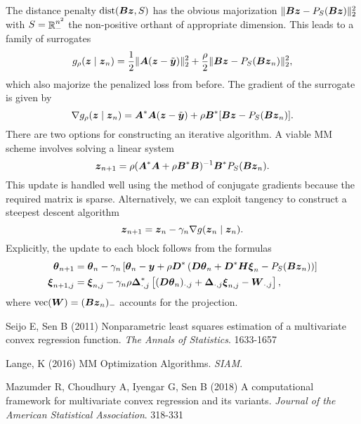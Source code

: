 \documentclass{article}
\begin{document}
The distance penalty \(\mathop{\rm dist}\nolimits(\boldsymbol{B} \boldsymbol{z}, S)\) has the obvious majorization \(\|\boldsymbol{B} \boldsymbol{z} - P_{S}(\boldsymbol{B} \boldsymbol{z})\|^{2}_{2}\) with \(S = \mathop{\mathbb{R}}\nolimits^{n^{2}}_{-}\) the non-positive orthant of appropriate dimension.
This leads to a family of surrogates
\begin{equation*}
    g_{\rho}(\boldsymbol{z} \mid \boldsymbol{z}_{n})
    =
    \frac{1}{2} \|\boldsymbol{A} (\boldsymbol{z} - \tilde{\boldsymbol{y}})\|_{2}^{2}
    +
    \frac{\rho}{2} \|\boldsymbol{B} \boldsymbol{z} - P_{S}(\boldsymbol{B} \boldsymbol{z}_{n})\|^{2}_{2},
\end{equation*}
which also majorize the penalized loss from before.
The gradient of the surrogate is given by
\begin{equation*}
    \nabla g_{\rho}(\boldsymbol{z} \mid \boldsymbol{z}_{n})
    =
    \boldsymbol{A}^{\ast} \boldsymbol{A} (\boldsymbol{z} - \tilde{\boldsymbol{y}})
    +
    \rho \boldsymbol{B}^{\ast}[\boldsymbol{B} \boldsymbol{z} - P_{S}(\boldsymbol{B} \boldsymbol{z}_{n})].
\end{equation*}
There are two options for constructing an iterative algorithm.
A viable MM scheme involves solving a linear system
\begin{equation*}
    \boldsymbol{z}_{n+1}
    =
    \rho (\boldsymbol{A}^{\ast} \boldsymbol{A} + \rho \boldsymbol{B}^{\ast} \boldsymbol{B})^{-1}
    \boldsymbol{B}^{\ast} P_{S}(\boldsymbol{B} \boldsymbol{z}_{n}).
\end{equation*}
This update is handled well using the method of conjugate gradients because the required matrix is sparse.
Alternatively, we can exploit tangency to construct a steepest descent algorithm
\begin{equation*}
    \boldsymbol{z}_{n+1}
    =
    \boldsymbol{z}_{n} - \gamma_{n} \nabla g(\boldsymbol{z}_{n} \mid \boldsymbol{z}_{n}).
\end{equation*}
Explicitly, the update to each block follows from the formulas
\begin{align*}
    \boldsymbol{\theta}_{n+1}
    &=
    \boldsymbol{\theta}_{n} - \gamma_{n}\left[
        \boldsymbol{\theta}_{n} - \boldsymbol{y}
        + \rho \boldsymbol{D}^{\ast} \left(\boldsymbol{D} \boldsymbol{\theta}_{n}
        + \boldsymbol{D}^{\ast} \boldsymbol{H} \boldsymbol{\xi}_{n} - P_{S}(\boldsymbol{B} \boldsymbol{z}_{n})
        \right)
    \right] \\
    \boldsymbol{\xi}_{n+1,j}
    &=
    \boldsymbol{\xi}_{n,j} - \gamma_{n} \rho \boldsymbol{\Delta}_{\cdot,j}^{\ast}\left[
        (\boldsymbol{D} \boldsymbol{\theta}_{n})_{\cdot,j}
        + \boldsymbol{\Delta}_{\cdot,j} \boldsymbol{\xi}_{n,j}
        - \boldsymbol{W}_{\cdot,j}
    \right],
\end{align*}
where \(\mathop{\rm vec}\nolimits(\boldsymbol{W}) = (\boldsymbol{B} \boldsymbol{z}_{n})_{-}\) accounts for the projection.


\begin{thebibliography}{99}
    Seijo E, Sen B (2011) {Nonparametric least squares estimation of a multivariate convex regression function}. {\it The Annals of Statistics}. 1633-1657
    
    Lange, K (2016) {MM Optimization Algorithms}. {\it SIAM}.

    Mazumder R, Choudhury A, Iyengar G, Sen B (2018) {A computational framework for multivariate convex regression and its variants}. {\it Journal of the American Statistical Association}. 318-331
\end{thebibliography}
\end{document}

